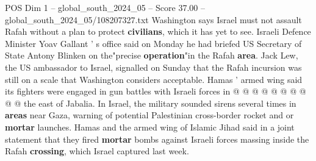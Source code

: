 \begin{textsample}{POS Dim 1 – global\_south\_2024\_05 – Score 37.00 – global\_south\_2024\_05/108207327.txt}
Washington says Israel must not assault Rafah without a plan to protect \textbf{civilians}, which it has yet to see.
Israeli Defence Minister Yoav Gallant ' s office said on Monday he had briefed US Secretary of State Antony Blinken on the"precise \textbf{operation}"in the Rafah \textbf{area}.
Jack Lew, the US ambassador to Israel, signalled on Sunday that the Rafah incursion was still on a scale that Washington considers acceptable.
Hamas ' armed wing said its fighters were engaged in gun battles with Israeli forces in @ @ @ @ @ @ @ @ @ @ the east of Jabalia.
In Israel, the military sounded sirens several times in \textbf{areas} near Gaza, warning of potential Palestinian cross-border rocket and or \textbf{mortar} launches.
Hamas and the armed wing of Islamic Jihad said in a joint statement that they fired \textbf{mortar} bombs against Israeli forces massing inside the Rafah \textbf{crossing}, which Israel captured last week.

\end{textsample}
